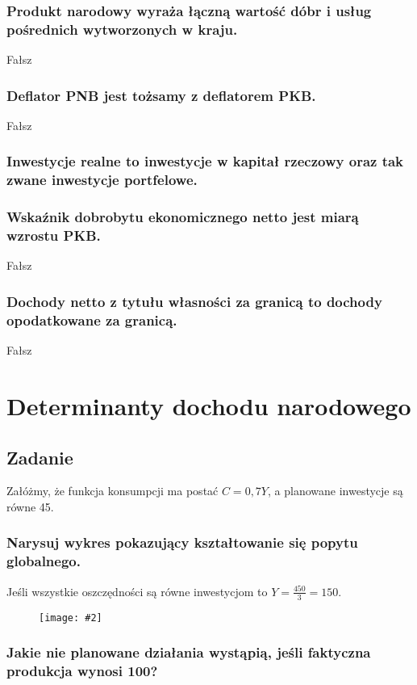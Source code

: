 \documentclass[a4paper,12pt]{article}
\newcommand{\obrazek}[2]{
	\begin{figure}[h]
		\centering
		\texttt{[image: \#2]}
	\end{figure}
}
\let\oldsection\section
\renewcommand\section{\clearpage\oldsection}
\begin{document}
\subsubsection{Produkt narodowy wyraża łączną wartość dóbr i usług pośrednich wytworzonych w kraju.}

Fałsz

\subsubsection{Deflator PNB jest tożsamy z deflatorem PKB.}
Fałsz

\subsubsection{Inwestycje realne to inwestycje w kapitał rzeczowy oraz tak zwane inwestycje portfelowe.}

\subsubsection{Wskaźnik dobrobytu ekonomicznego netto jest miarą wzrostu PKB.}
Fałsz

\subsubsection{Dochody netto z tytułu własności za granicą to dochody opodatkowane za granicą.}
Fałsz

\section{Determinanty dochodu narodowego}

\subsection{Zadanie}

Załóżmy, że funkcja konsumpcji ma postać $C = 0,7Y$, a planowane inwestycje są równe 45.

\subsubsection{Narysuj wykres pokazujący kształtowanie się popytu globalnego.}

Jeśli wszystkie oszczędności są równe inwestycjom to $Y = \frac{450}{3} = 150$.

\obrazek{0.3}{PopytGlobalny.png}

\subsubsection{Jakie nie planowane działania wystąpią, jeśli faktyczna produkcja wynosi 100?}
\end{document}
